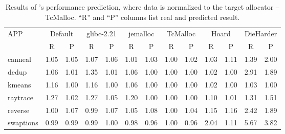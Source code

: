\begin{table}[]
  \centering
  \footnotesize
  \setlength{\tabcolsep}{0.2em}
\begin{tabular}{l|c|c|c|c|c|c|c|c|c|c|c|c}
\hline
 \multirow{2}{*}{APP} &
  \multicolumn{2}{c|}{Default} &
  \multicolumn{2}{c|}{glibc-2.21} &
  \multicolumn{2}{c|}{jemalloc} &
  \multicolumn{2}{c|}{TcMalloc} &
  \multicolumn{2}{c|}{Hoard} &
  \multicolumn{2}{c}{DieHarder} \\ \cline{2-13}
  & R & P & R & P & R & P & R & P & R & P  & R & P    \\ \hline
canneal        & 1.05 & 1.05 & 1.07 & 1.06 & 1.01 & 1.03 & 1.00 & 1.02 & 1.03 & 1.11 & 1.39 & 2.00 \\ \hline
dedup          & 1.06 & 1.01 & 1.35 & 1.01 & 1.06 & 1.00 & 1.00 & 1.00 & 1.02 & 1.00 & 2.91 & 1.89 \\ \hline
kmeans         & 1.16 & 1.00 & 1.16 & 1.00 & 1.06 & 1.00 & 1.00 & 1.00 & 1.02 & 1.00 & 1.03 & 1.00 \\ \hline
raytrace       & 1.27 & 1.02 & 1.27 & 1.05 & 1.20 & 1.00 & 1.00 & 1.00 & 1.10 & 1.01 & 1.31 & 1.51 \\ \hline
reverse & 1.00 & 1.07 & 0.99 & 1.07 & 1.05 & 1.08 & 1.00 & 1.04 & 1.15 & 1.16 & 2.42 & 1.89 \\ \hline
swaptions      & 0.99 & 0.99 & 0.99 & 1.00 & 0.98 & 0.96 & 1.00 & 0.96 & 2.04 & 1.11 & 5.67 & 3.82 \\ \hline
\end{tabular}
   \caption{ Results of \MP{}'s performance prediction, where data is normalized to the target allocator -- TcMalloc. ``R'' and ``P'' columns list real and predicted result.  \label{tbl:predictionResult}}
\end{table}

